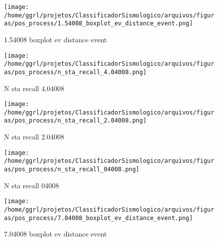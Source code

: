 
                    \begin{figure}[H]
                        \centering
                        \texttt{[image: /home/ggrl/projetos/ClassificadorSismologico/arquivos/figuras/pos\_process/1.54008\_boxplot\_ev\_distance\_event.png]}
                        \caption{1.54008 boxplot ev distance event}
                        \label{fig:1.54008_boxplot_ev_distance_event}
                    \end{figure}
                

                    \begin{figure}[H]
                        \centering
                        \texttt{[image: /home/ggrl/projetos/ClassificadorSismologico/arquivos/figuras/pos\_process/n\_sta\_recall\_4.04008.png]}
                        \caption{N sta recall 4.04008}
                        \label{fig:n_sta_recall_4.04008}
                    \end{figure}
                

                    \begin{figure}[H]
                        \centering
                        \texttt{[image: /home/ggrl/projetos/ClassificadorSismologico/arquivos/figuras/pos\_process/n\_sta\_recall\_2.04008.png]}
                        \caption{N sta recall 2.04008}
                        \label{fig:n_sta_recall_2.04008}
                    \end{figure}
                

                    \begin{figure}[H]
                        \centering
                        \texttt{[image: /home/ggrl/projetos/ClassificadorSismologico/arquivos/figuras/pos\_process/n\_sta\_recall\_04008.png]}
                        \caption{N sta recall 04008}
                        \label{fig:n_sta_recall_04008}
                    \end{figure}
                

                    \begin{figure}[H]
                        \centering
                        \texttt{[image: /home/ggrl/projetos/ClassificadorSismologico/arquivos/figuras/pos\_process/7.04008\_boxplot\_ev\_distance\_event.png]}
                        \caption{7.04008 boxplot ev distance event}
                        \label{fig:7.04008_boxplot_ev_distance_event}
                    \end{figure}
                

